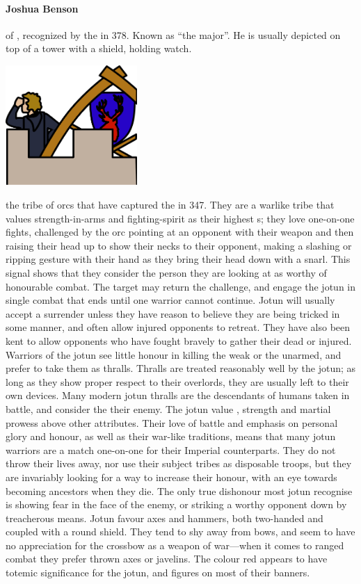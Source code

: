 \paragraph{Joshua Benson}  of , recognized by the  in 378. Known as “the major”. He is usually depicted on top of a tower with a shield, holding watch. \begin{center}\includegraphics[width=5cm]{encyclopedia/Major} \end{center}
 the tribe of  orcs that have captured the  in 347. They are a warlike tribe that values strength-in-arms and fighting-spirit as their highest s; they love one-on-one fights, challenged by the orc pointing at an opponent with their weapon and then raising their head up to show their necks to their opponent, making a slashing or ripping gesture with their hand as they bring their head down with a snarl. This signal shows that they consider the person they are looking at as worthy of honourable combat. The target may return the challenge, and engage the jotun in single combat that ends until one warrior cannot continue. \localpar Jotun will usually accept a surrender unless they have reason to believe they are being tricked in some manner, and often allow injured opponents to retreat. They have also been kent to allow opponents who have fought bravely to gather their dead or injured. Warriors of the jotun see little honour in killing the weak or the unarmed, and prefer to take them as thralls. Thralls are treated reasonably well by the jotun; as long as they show proper respect to their overlords, they are usually left to their own devices. Many modern jotun thralls are the descendants of humans taken in battle, and consider the  their enemy. \localpar The jotun value , strength and martial prowess above other attributes. Their love of battle and emphasis on personal glory and honour, as well as their war-like traditions, means that many jotun warriors are a match one-on-one for their Imperial counterparts. They do not throw their lives away, nor use their subject tribes as disposable troops, but they are invariably looking for a way to increase their honour, with an eye towards becoming ancestors when they die. The only true dishonour most jotun recognise is showing fear in the face of the enemy, or striking a worthy opponent down by treacherous means. \localpar Jotun favour axes and hammers, both two-handed and coupled with a round shield. They tend to shy away from bows, and seem to have no appreciation for the crossbow as a weapon of war—when it comes to ranged combat they prefer thrown axes or javelins. The colour red appears to have totemic significance for the jotun, and figures on most of their banners. 
